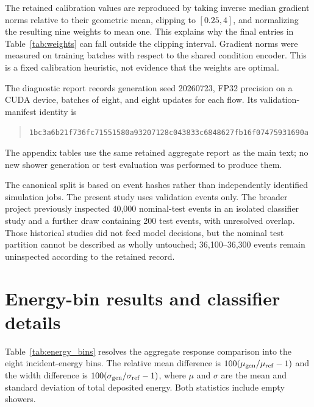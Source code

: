 \documentclass[11pt]{article}
\begin{document}
The retained calibration values are reproduced by taking inverse median gradient norms relative to their geometric mean, clipping to $[0.25,4]$, and normalizing the resulting nine weights to mean one. This explains why the final entries in Table~\ref{tab:weights} can fall outside the clipping interval. Gradient norms were measured on training batches with respect to the shared condition encoder. This is a fixed calibration heuristic, not evidence that the weights are optimal.

The diagnostic report records generation seed 20260723, FP32 precision on a CUDA device, batches of eight, and eight updates for each flow. Its validation-manifest identity is
\begin{quote}\footnotesize\nolinkurl{1bc3a6b21f736fc71551580a93207128c043833c6848627fb16f07475931690a}\end{quote}
The appendix tables use the same retained aggregate report as the main text; no new shower generation or test evaluation was performed to produce them.

The canonical split is based on event hashes rather than independently identified simulation jobs. The present study uses validation events only. The broader project previously inspected 40,000 nominal-test events in an isolated classifier study and a further draw containing 200 test events, with unresolved overlap. Those historical studies did not feed model decisions, but the nominal test partition cannot be described as wholly untouched; 36,100--36,300 events remain uninspected according to the retained record.

\clearpage
\section{Energy-bin results and classifier details}
\label{app:additional}

Table~\ref{tab:energy_bins} resolves the aggregate response comparison into the eight incident-energy bins. The relative mean difference is $100(\mu_{\rm gen}/\mu_{\rm ref}-1)$ and the width difference is $100(\sigma_{\rm gen}/\sigma_{\rm ref}-1)$, where $\mu$ and $\sigma$ are the mean and standard deviation of total deposited energy. Both statistics include empty showers.
\end{document}
